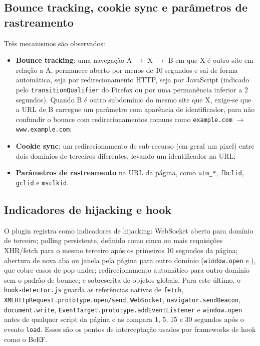 \documentclass[11pt,a4paper]{article}
\begin{document}
\subsection{Bounce tracking, cookie sync e parâmetros de rastreamento}

Três mecanismos são observados:
\begin{itemize}
  \item \textbf{Bounce tracking}: uma navegação A $\rightarrow$ X $\rightarrow$ B em que X é outro site em relação a A, permanece aberto por menos de 10 segundos e sai de forma automática, seja por redirecionamento HTTP, seja por JavaScript (indicado pelo \texttt{transitionQualifier} do Firefox ou por uma permanência inferior a 2 segundos). Quando B é outro subdomínio do mesmo site que X, exige-se que a URL de B carregue um parâmetro com aparência de identificador, para não confundir o bounce com redirecionamentos comuns como \texttt{example.\allowbreak{}com} $\rightarrow$ \texttt{www.\allowbreak{}example.\allowbreak{}com};
  \item \textbf{Cookie sync}: um redirecionamento de sub-recurso (em geral um pixel) entre dois domínios de terceiros diferentes, levando um identificador na URL;
  \item \textbf{Parâmetros de rastreamento} na URL da página, como \texttt{utm\_*}, \texttt{fbclid}, \texttt{gclid} e \texttt{msclkid}.
\end{itemize}

\subsection{Indicadores de hijacking e hook}

O plugin registra como indicadores de hijacking: WebSocket aberto para domínio de terceiro; polling persistente, definido como cinco ou mais requisições XHR/fetch para o mesmo terceiro após os primeiros 10 segundos da página; abertura de nova aba ou janela pela página para outro domínio (\texttt{window.\allowbreak{}open} e ), que cobre casos de pop-under; redirecionamento automático para outro domínio sem o padrão de bounce; e sobrescrita de objetos globais. Para este último, o \texttt{hook-detector.\allowbreak{}js} guarda as referências nativas de \texttt{fetch}, \texttt{XMLHttpRequest.\allowbreak{}prototype.\allowbreak{}open/\allowbreak{}send}, \texttt{WebSocket}, \texttt{navigator.\allowbreak{}sendBeacon}, \texttt{document.\allowbreak{}write}, \texttt{EventTarget.\allowbreak{}prototype.\allowbreak{}addEventListener} e \texttt{window.\allowbreak{}open} antes de qualquer script da página e as compara 1, 5, 15 e 30 segundos após o evento \texttt{load}. Esses são os pontos de interceptação usados por frameworks de hook como o BeEF.
\end{document}
